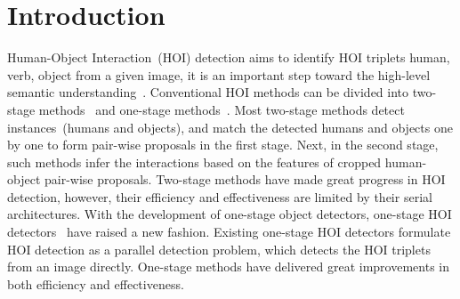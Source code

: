 \documentclass[final]{cvpr}
\begin{document}
\vspace{-2mm}\section{Introduction}
\vspace{-1mm}
Human-Object Interaction~(HOI) detection aims to identify HOI triplets human, verb, object from a given image, it is an important step toward the high-level semantic understanding~\cite{gao2020interactgan,Liao_2020_CVPR,yu2020cross,hui2020linguistic,Huang_2020_CVPR,Jiang_2020_CVPR,gao2020adversarialnas,gao2020recapture,you2020greedynas}. Conventional HOI methods can be divided into two-stage methods~\cite{shen2018scaling,chao2018learning,gao2018ican,li2018transferable,Li_2019_CVPR,Gupta_2019_ICCV,Gao-ECCV-DRG,ren2020scene} and one-stage methods~\cite{Kim2020_unidet,liao2020ppdm}. Most two-stage methods detect instances~(humans and objects), and match the detected humans and objects one by one to form pair-wise proposals in the first stage. Next, in the second stage, such methods infer the interactions based on the features of cropped human-object pair-wise proposals. Two-stage methods have made great progress in HOI detection, however, their efficiency and effectiveness are limited by their serial architectures. With the development of one-stage object detectors, one-stage HOI detectors~\cite{Kim2020_unidet,liao2020ppdm} have raised a new fashion. Existing one-stage HOI detectors formulate HOI detection as a parallel detection problem, which detects the HOI triplets from an image directly. One-stage methods have delivered great improvements in both efficiency and effectiveness. 
\end{document}
